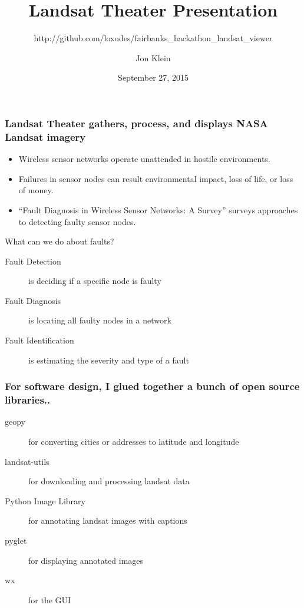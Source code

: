 \documentclass{beamer}
\title{Landsat Theater Presentation}
\subtitle{http://github.com/loxodes/fairbanks\_hackathon\_landsat\_viewer}
\author{Jon Klein}
\institute{University of Alaska, Fairbanks}
\date{September 27, 2015}
\begin{document}
    \begin{frame}
        \titlepage
    \end{frame}

    \begin{frame}
        \frametitle{Landsat Theater gathers, process, and displays NASA Landsat imagery}
        \begin{itemize}
            \item Wireless sensor networks operate unattended in hostile environments.
            \item Failures in sensor nodes can result environmental impact, loss of life, or loss of money. 
            \item ``Fault Diagnosis in Wireless Sensor Networks: A Survey'' surveys approaches to detecting faulty sensor nodes.
        \end{itemize}

        \begin{block}{What can we do about faults?}
            \begin{description}
                \item[Fault Detection] is deciding if a specific node is faulty
                \item[Fault Diagnosis] is locating all faulty nodes in a network
                \item[Fault Identification] is estimating the severity and type of a fault
            \end{description}
        \end{block}

    \end{frame}
 
    \begin{frame}
        \frametitle{For software design, I glued together a bunch of open source libraries..}
        \begin{description}
            \item[geopy] for converting cities or addresses to latitude and longitude
            \item[landsat-utils] for downloading and processing landsat data
            \item[Python Image Library] for annotating landsat images with captions
            \item[pyglet] for displaying annotated images
            \item[wx] for the GUI
        \end{description}
    \end{frame}
 
\end{document}

